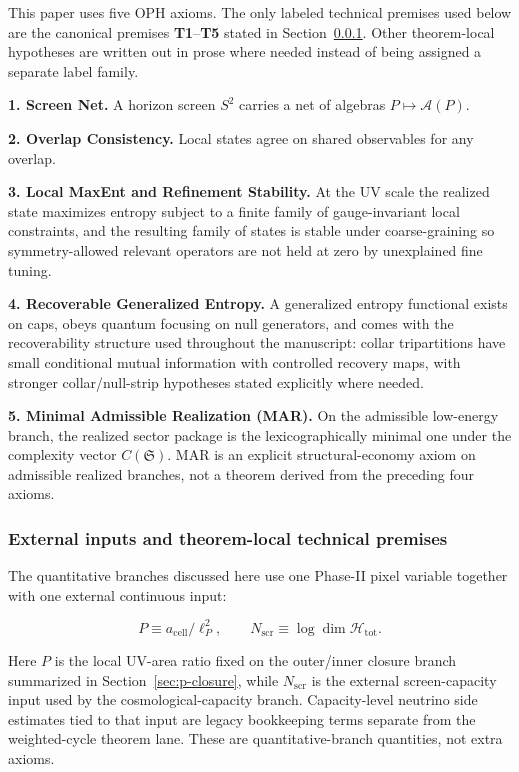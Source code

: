 This paper uses five OPH axioms. The only labeled technical premises used below are the canonical premises \textbf{T1}--\textbf{T5} stated in Section~\ref{14-assumptions-and-external-inputs}. Other theorem-local hypotheses are written out in prose where needed instead of being assigned a separate label family.

\textbf{1. Screen Net.} A horizon screen \(S^2\) carries a net of algebras \(P \mapsto \mathcal{A}(P)\).

\textbf{2. Overlap Consistency.} Local states agree on shared observables for any overlap.

\textbf{3. Local MaxEnt and Refinement Stability.} At the UV scale the realized state maximizes entropy subject to a finite family of gauge-invariant local constraints, and the resulting family of states is stable under coarse-graining so symmetry-allowed relevant operators are not held at zero by unexplained fine tuning.

\textbf{4. Recoverable Generalized Entropy.} A generalized entropy functional exists on caps, obeys quantum focusing on null generators, and comes with the recoverability structure used throughout the manuscript: collar tripartitions have small conditional mutual information with controlled recovery maps, with stronger collar/null-strip hypotheses stated explicitly where needed.

\textbf{5. Minimal Admissible Realization (MAR).} On the admissible low-energy branch, the realized sector package is the lexicographically minimal one under the complexity vector \(C(\mathfrak S)\). MAR is an explicit structural-economy axiom on admissible realized branches, not a theorem derived from the preceding four axioms.

\subsubsection{External inputs and theorem-local technical premises}\label{14-assumptions-and-external-inputs}

The quantitative branches discussed here use one Phase-II pixel variable together with one
external continuous input:

\[
P \equiv a_{\mathrm{cell}}/\ell_P^2,
\qquad
N_{\mathrm{scr}} \equiv \log \dim \mathcal H_{\mathrm{tot}}.
\]

Here \(P\) is the local UV-area ratio fixed on the outer/inner closure branch summarized in
Section~\ref{sec:p-closure}, while \(N_{\mathrm{scr}}\) is the external screen-capacity input
used by the cosmological-capacity branch. Capacity-level neutrino side estimates tied to that
input are legacy bookkeeping terms separate from the weighted-cycle theorem lane. These are
quantitative-branch quantities, not extra axioms.

